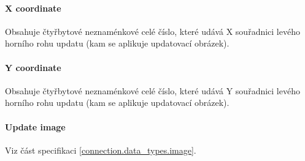 \paragraph{X coordinate}
Obsahuje čtyřbytové neznaménkové celé číslo, které udává X souřadnici levého horního rohu updatu (kam se aplikuje updatovací obrázek).

\paragraph{Y coordinate}

Obsahuje čtyřbytové neznaménkové celé číslo, které udává Y souřadnici levého horního rohu updatu (kam se aplikuje updatovací obrázek).

\paragraph{Update image}

Viz část specifikaci \ref{connection.data_types.image}.